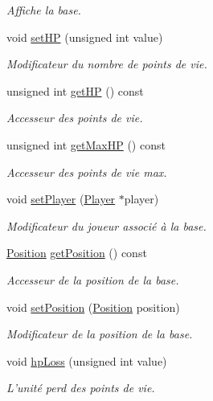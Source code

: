 \begin{DoxyCompactItemize}
\begin{DoxyCompactList}\small\item\em Affiche la base. \end{DoxyCompactList}\item 
void \hyperlink{classBase_a0e05c8081bb85324b884abfa6712f6fb}{set\+H\+P} (unsigned int value)
\begin{DoxyCompactList}\small\item\em Modificateur du nombre de points de vie. \end{DoxyCompactList}\item 
unsigned int \hyperlink{classBase_a8fd6606cff73e39cd05225bd7b395218}{get\+H\+P} () const 
\begin{DoxyCompactList}\small\item\em Accesseur des points de vie. \end{DoxyCompactList}\item 
unsigned int \hyperlink{classBase_a8599d1b3c4d1b744d5e3d42abfb47361}{get\+Max\+H\+P} () const 
\begin{DoxyCompactList}\small\item\em Accesseur des points de vie max. \end{DoxyCompactList}\item 
void \hyperlink{classBase_a0e2dd85f633ed25b9ab144fb7c769b7b}{set\+Player} (\hyperlink{classPlayer}{Player} $\ast$player)
\begin{DoxyCompactList}\small\item\em Modificateur du joueur associé à la base. \end{DoxyCompactList}\item 
\hyperlink{classPosition}{Position} \hyperlink{classBase_ae2abb880ce9543ac70419714f8c1181f}{get\+Position} () const 
\begin{DoxyCompactList}\small\item\em Accesseur de la position de la base. \end{DoxyCompactList}\item 
void \hyperlink{classBase_a17fc3f12f7aedbf5a8be8f0f271a3f62}{set\+Position} (\hyperlink{classPosition}{Position} position)
\begin{DoxyCompactList}\small\item\em Modificateur de la position de la base. \end{DoxyCompactList}\item 
void \hyperlink{classBase_a3f6ba779a531b048daa9cec42c945b91}{hp\+Loss} (unsigned int value)
\begin{DoxyCompactList}\small\item\em L'unité perd des points de vie. \end{DoxyCompactList}\end{DoxyCompactItemize}


